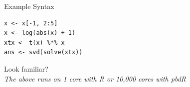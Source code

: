 


\begin{frame}[fragile]
  \begin{block}{Example Syntax}\pause
  \begin{lstlisting}
x <- x[-1, 2:5]
x <- log(abs(x) + 1)
xtx <- t(x) %*% x
ans <- svd(solve(xtx))
  \end{lstlisting}
  \begin{center}
  \pause Look familiar?\\[.4cm] \pause
  \emph{The above runs on 1 core with R or 10,000 cores with pbdR}
  \end{center}
  \end{block}
\end{frame}


